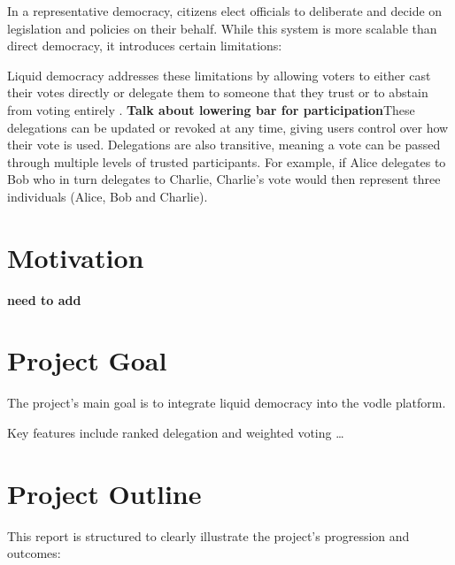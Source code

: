 In a representative democracy, citizens elect officials to deliberate and decide on legislation and policies on their behalf. While this system is more scalable than direct democracy, it introduces certain limitations:

Liquid democracy addresses these limitations by allowing voters to either cast their votes directly or delegate them to someone that they trust or to abstain from voting entirely \citep{blum_liquid_2016}. \textbf{Talk about lowering bar for participation}These delegations can be updated or revoked at any time, giving users control over how their vote is used. Delegations are also transitive, meaning a vote can be passed through multiple levels of trusted participants. For example, if Alice delegates to Bob who in turn delegates to Charlie, Charlie's vote would then represent three individuals (Alice, Bob and Charlie).



\section{Motivation}

\textbf{need to add}

\section{Project Goal}
The project's main goal is to integrate liquid democracy into the vodle platform.

Key features include ranked delegation and weighted voting \dots

\section{Project Outline}
This report is structured to clearly illustrate the project's progression and outcomes:


